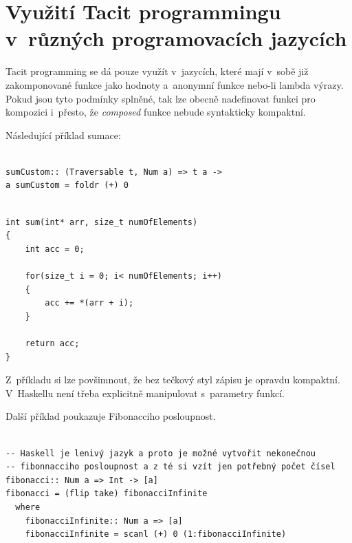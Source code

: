 \documentclass[male, czech]{kithesis}
\newenvironment{code}{\captionsetup{type=listing}}{}
\begin{document}
\section{Využití Tacit programmingu v~různých programovacích jazycích}

Tacit programming se dá pouze využít v~jazycích,
které mají v~sobě již zakomponované funkce jako hodnoty
a~anonymní funkce nebo-li lambda výrazy.
Pokud jsou tyto podmínky splněné, 
tak lze obecně nadefinovat funkci pro kompozici i~přesto,
že \textit{composed} funkce nebude syntakticky kompaktní.

Následující příklad sumace:

\begin{code}
\begin{verbatim}

sumCustom:: (Traversable t, Num a) => t a ->
a sumCustom = foldr (+) 0

\end{verbatim}
\end{code}

\begin{code}
\begin{verbatim}

int sum(int* arr, size_t numOfElements)
{
    int acc = 0;
    
    for(size_t i = 0; i< numOfElements; i++)
    {
        acc += *(arr + i);
    }
    
    return acc;
}

\end{verbatim}
\end{code}
Z~příkladu si lze povšimnout, 
že bez tečkový styl zápisu je opravdu kompaktní. 
V~Haskellu není třeba explicitně manipulovat s~parametry funkcí.

Další příklad poukazuje Fibonacciho posloupnost.
\begin{code}
\begin{verbatim}

-- Haskell je lenivý jazyk a proto je možné vytvořit nekonečnou 
-- fibonnacciho posloupnost a z té si vzít jen potřebný počet čísel 
fibonacci:: Num a => Int -> [a]
fibonacci = (flip take) fibonacciInfinite
  where
    fibonacciInfinite:: Num a => [a]
    fibonacciInfinite = scanl (+) 0 (1:fibonacciInfinite)

\end{verbatim}
\end{code}
\end{document}
